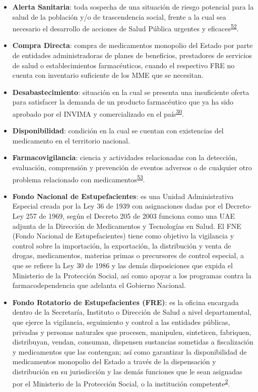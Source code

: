 \documentclass[
  oneside]{book}
\begin{document}
\begin{itemize}
\item
  \textbf{Alerta Sanitaria}: toda sospecha de una situación de riesgo potencial para la salud de la población y/o de trascendencia social, frente a la cual sea necesario el desarrollo de acciones de Salud Pública urgentes y eficaces\textsuperscript{\protect\hyperlink{ref-INVIMA2021-ALERTAS}{52}}.
\item
  \textbf{Compra Directa}: compra de medicamentos monopolio del Estado por parte de entidades administradoras de planes de beneficios, prestadores de servicios de salud o establecimientos farmacéuticos, cuando el respectivo FRE no cuenta con inventario suficiente de los MME que se necesitan.
\item
  \textbf{Desabastecimiento}: situación en la cual se presenta una insuficiente oferta para satisfacer la demanda de un producto farmacéutico que ya ha sido aprobado por el INVIMA y comercializado en el país\textsuperscript{\protect\hyperlink{ref-INVIMA2018-Desabast}{30}}.
\item
  \textbf{Disponibilidad}: condición en la cual se cuentan con existencias del medicamento en el territorio nacional.
\item
  \textbf{Farmacovigilancia}: ciencia y actividades relacionadas con la detección, evaluación, comprensión y prevención de eventos adversos o de cualquier otro problema relacionado con medicamentos\textsuperscript{\protect\hyperlink{ref-INVIMA2006-FV}{53}}.
\item
  \textbf{Fondo Nacional de Estupefacientes}: es una Unidad Administrativa Especial creada por la Ley 36 de 1939 con asignaciones dadas por el Decreto-Ley 257 de 1969, según el Decreto 205 de 2003 funciona como una UAE adjunta de la Dirección de Medicamentos y Tecnologías en Salud. El FNE (Fondo Nacional de Estupefacientes) tiene como objetivo la vigilancia y control sobre la importación, la exportación, la distribución y venta de drogas, medicamentos, materias primas o precursores de control especial, a que se refiere la Ley 30 de 1986 y las demás disposiciones que expida el Ministerio de la Protección Social, así como apoyar a los programas contra la farmacodependencia que adelanta el Gobierno Nacional.
\item
  \textbf{Fondo Rotatorio de Estupefacientes (FRE)}: es la oficina encargada dentro de la Secretaría, Instituto o Dirección de Salud a nivel departamental, que ejerce la vigilancia, seguimiento y control a las entidades públicas, privadas y personas naturales que procesen, manipulen, sinteticen, fabriquen, distribuyan, vendan, consuman, dispensen sustancias sometidas a fiscalización y medicamentos que las contengan; así como garantizar la disponibilidad de medicamentos monopolio del Estado a través de la dispensación y distribución en su jurisdicción y las demás funciones que le sean asignadas por el Ministerio de la Protección Social, o la institución competente\textsuperscript{\protect\hyperlink{ref-MSPS1479-2006}{2}}.

\end{itemize}
\end{document}
